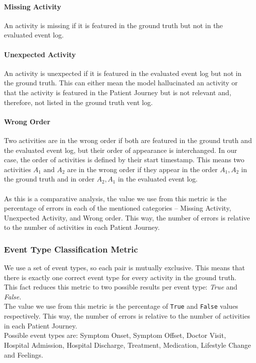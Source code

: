\paragraph{Missing Activity} An activity is missing if it is featured in the ground truth but not in the evaluated event log. 
\paragraph{Unexpected Activity} An activity is unexpected if it is featured in the evaluated event log but not in the ground truth. This can either mean the model hallucinated an activity or that the activity is featured in the Patient Journey but is not relevant and, therefore, not listed in the ground truth vent log.
\paragraph{Wrong Order} Two activities are in the wrong order if both are featured in the ground truth and the evaluated event log, but their order of appearance is interchanged. In our case, the order of activities is defined by their start timestamp. This means two activities $A_1 \text{ and } A_2$ are in the wrong order if they appear in the order $A_1,A_2$ in the ground truth and in order $A_2, A_1$ in the evaluated event log.\\\\
As this is a comparative analysis, the value we use from this metric is the percentage of errors in each of the mentioned categories – Missing Activity, Unexpected Activity, and Wrong order. This way, the number of errors is relative to the number of activities in each Patient Journey.

\subsubsection{Event Type Classification Metric}\label{sec:eventtype_metric}
We use a set of event types, so each pair is mutually exclusive. This means that there is exactly one correct event type for every activity in the ground truth. This fact reduces this metric to two possible results per event type: \emph{True} and \emph{False.}\\
The value we use from this metric is the percentage of \verb|True| and \verb|False| values respectively. This way, the number of errors is relative to the number of activities in each Patient Journey.\\
Possible event types are: Symptom Onset, Symptom Offset, Doctor Visit, Hospital Admission, Hospital Discharge, Treatment, Medication, Lifestyle Change and Feelings.

